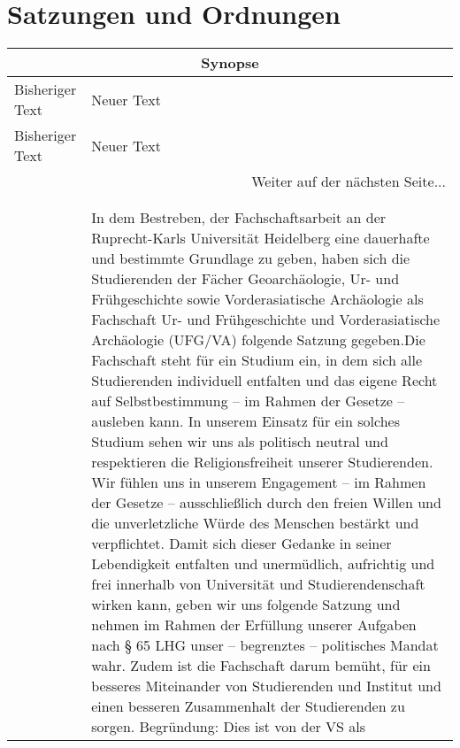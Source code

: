 \section{Satzungen und Ordnungen}

{
    \begin{longtable}{|p{7.5cm}|p{7.5cm}|}
        \hline
        \multicolumn{2}{|c|}{Synopse}\\\hline
        Bisheriger Text & Neuer Text \\\hline
        \endfirsthead
        \hline
        Bisheriger Text & Neuer Text \\
        \hline
        \endhead
        \hline
        \multicolumn{2}{|r|}{Weiter auf der nächsten Seite...}\\
        \hline
        \endfoot
        \hline
        \multicolumn{2}{c}{Ende der Synopse} \\
        \endlastfoot
        \multicolumn{2}{|c|}{Präambel}\\\hline
        & 
        In dem Bestreben, der Fachschaftsarbeit an der Ruprecht-Karls Universität Heidelberg
        eine dauerhafte und bestimmte Grundlage zu geben, haben sich die Studierenden der
        Fächer Geoarchäologie, Ur- und Frühgeschichte sowie Vorderasiatische Archäologie als
        Fachschaft Ur- und Frühgeschichte und Vorderasiatische Archäologie (UFG/VA) folgende
        Satzung gegeben.\newline Die Fachschaft steht für ein Studium ein, in dem sich alle Studierenden individuell
        entfalten und das eigene Recht auf Selbstbestimmung – im Rahmen der Gesetze –
        ausleben kann. In unserem Einsatz für ein solches Studium sehen wir uns als politisch
        neutral und respektieren die Religionsfreiheit unserer Studierenden. Wir fühlen uns
        in unserem Engagement – im Rahmen der Gesetze – ausschließlich durch den freien
        Willen und die unverletzliche Würde des Menschen bestärkt und verpflichtet. Damit
        sich dieser Gedanke in seiner Lebendigkeit entfalten und unermüdlich, aufrichtig und
        frei innerhalb von Universität und Studierendenschaft wirken kann, geben wir uns
        folgende Satzung und nehmen im Rahmen der Erfüllung unserer Aufgaben nach § 65 LHG
        unser – begrenztes – politisches Mandat wahr. Zudem ist die Fachschaft darum bemüht,
        für ein besseres Miteinander von Studierenden und Institut und einen besseren
        Zusammenhalt der Studierenden zu sorgen. Begründung: Dies ist von der VS als

\end{longtable}}
